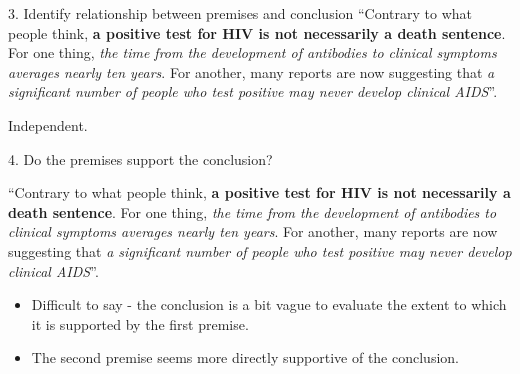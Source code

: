 \documentclass{beamer}
\begin{document}



\begin{frame}{3. Identify relationship between premises and conclusion}
	``Contrary to what people think, \textbf{a positive test for HIV is not necessarily a death sentence}. For one thing, \emph{the time from the development of antibodies to clinical symptoms averages nearly ten years}. For another, many reports are now suggesting that \emph{a significant number of people who test positive may never develop clinical AIDS}''.
	
\vspace{12pt}
Independent.
\end{frame}



\begin{frame}{4. Do the premises support the conclusion?}

	``Contrary to what people think, \textbf{a positive test for HIV is not necessarily a death sentence}. For one thing, \emph{the time from the development of antibodies to clinical symptoms averages nearly ten years}. For another, many reports are now suggesting that \emph{a significant number of people who test positive may never develop clinical AIDS}''.

\begin{itemize}
\item Difficult to say - the conclusion is a bit vague to evaluate the extent to which it is supported by the first premise.
\item The second premise seems more directly supportive of the conclusion.
\end{itemize}
\end{frame}


\end{document}
